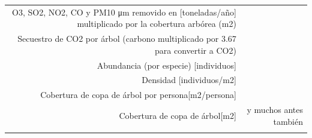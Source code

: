 \documentclass[12pt,]{book}
\begin{document}
\begin{longtable}[]{@{}rr@{}}
\begin{minipage}[t]{0.57\columnwidth}\raggedleft\strut
O3, SO2, NO2, CO y PM10 μm removido en {[}toneladas/año{]} multiplicado
por la cobertura arbórea (m2)\strut
\end{minipage} & \begin{minipage}[t]{0.31\columnwidth}\raggedleft\strut
\citep{gomez-baggethun_classifying_2013}\strut
\end{minipage}\tabularnewline
\begin{minipage}[t]{0.57\columnwidth}\raggedleft\strut
Secuestro de CO2 por árbol (carbono multiplicado por 3.67 para convertir
a CO2)\strut
\end{minipage} & \begin{minipage}[t]{0.31\columnwidth}\raggedleft\strut
\citep{gomez-baggethun_classifying_2013}\strut
\end{minipage}\tabularnewline
\begin{minipage}[t]{0.57\columnwidth}\raggedleft\strut
Abundancia (por especie) {[}individuos{]}\strut
\end{minipage} & \begin{minipage}[t]{0.31\columnwidth}\raggedleft\strut
\citep{alanis_estructura_2014}\strut
\end{minipage}\tabularnewline
\begin{minipage}[t]{0.57\columnwidth}\raggedleft\strut
Densidad {[}individuos/m2{]}\strut
\end{minipage} & \begin{minipage}[t]{0.31\columnwidth}\raggedleft\strut
\citep{nowak_sustaining_2010}\strut
\end{minipage}\tabularnewline
\begin{minipage}[t]{0.57\columnwidth}\raggedleft\strut
Cobertura de copa de árbol por persona{[}m2/persona{]}\strut
\end{minipage} & \begin{minipage}[t]{0.31\columnwidth}\raggedleft\strut
\citep{nowak_sustaining_2010}\strut
\end{minipage}\tabularnewline
\begin{minipage}[t]{0.57\columnwidth}\raggedleft\strut
Cobertura de copa de árbol{[}m2{]}\strut
\end{minipage} & \begin{minipage}[t]{0.31\columnwidth}\raggedleft\strut
\citep{nowak_sustaining_2010} y muchos antes también\strut
\end{minipage}\tabularnewline
\begin{minipage}[t]{0.57\columnwidth}\raggedleft\strut

\end{minipage}
\end{longtable}
\end{document}
